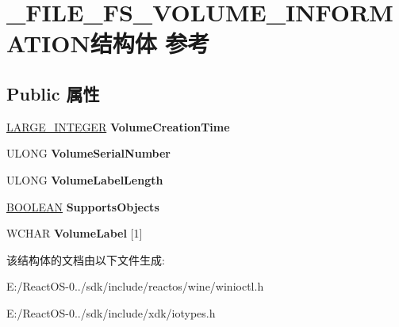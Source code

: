 \hypertarget{struct___f_i_l_e___f_s___v_o_l_u_m_e___i_n_f_o_r_m_a_t_i_o_n}{}\section{\+\_\+\+F\+I\+L\+E\+\_\+\+F\+S\+\_\+\+V\+O\+L\+U\+M\+E\+\_\+\+I\+N\+F\+O\+R\+M\+A\+T\+I\+O\+N结构体 参考}
\label{struct___f_i_l_e___f_s___v_o_l_u_m_e___i_n_f_o_r_m_a_t_i_o_n}
\subsection*{Public 属性}
\begin{DoxyCompactItemize}
\item 
\mbox{\label{struct___f_i_l_e___f_s___v_o_l_u_m_e___i_n_f_o_r_m_a_t_i_o_n_a6e8c5307d95a685a7556d8af3d76206f}} 
\hyperlink{union___l_a_r_g_e___i_n_t_e_g_e_r}{L\+A\+R\+G\+E\+\_\+\+I\+N\+T\+E\+G\+ER} {\bfseries Volume\+Creation\+Time}
\item 
\mbox{\label{struct___f_i_l_e___f_s___v_o_l_u_m_e___i_n_f_o_r_m_a_t_i_o_n_ae9e39477bddfd8b223cef25552c3b09b}} 
U\+L\+O\+NG {\bfseries Volume\+Serial\+Number}
\item 
\mbox{\label{struct___f_i_l_e___f_s___v_o_l_u_m_e___i_n_f_o_r_m_a_t_i_o_n_a3faacc40c878130a0ee289dc9806734b}} 
U\+L\+O\+NG {\bfseries Volume\+Label\+Length}
\item 
\mbox{\label{struct___f_i_l_e___f_s___v_o_l_u_m_e___i_n_f_o_r_m_a_t_i_o_n_aa00bf95b1542c719051112c017d7190a}} 
\hyperlink{_processor_bind_8h_a112e3146cb38b6ee95e64d85842e380a}{B\+O\+O\+L\+E\+AN} {\bfseries Supports\+Objects}
\item 
\mbox{\label{struct___f_i_l_e___f_s___v_o_l_u_m_e___i_n_f_o_r_m_a_t_i_o_n_a7867f0758bfe78784f5a9f15c27c2d15}} 
W\+C\+H\+AR {\bfseries Volume\+Label} \mbox{[}1\mbox{]}
\end{DoxyCompactItemize}


该结构体的文档由以下文件生成\+:\begin{DoxyCompactItemize}
\item 
E\+:/\+React\+O\+S-\/0../sdk/include/reactos/wine/winioctl.\+h\item 
E\+:/\+React\+O\+S-\/0../sdk/include/xdk/iotypes.\+h\end{DoxyCompactItemize}
